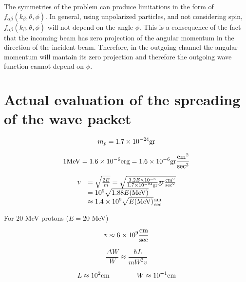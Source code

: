 The symmetries of the problem can produce limitations in the form of $f_{\alpha \beta}(k_{\beta},\theta,\phi)$. In general, using unpolarized particles, and not considering spin, $f_{\alpha \beta}(k_{\beta},\theta,\phi)$ will not depend on the angle $\phi$. This is a consequence of the fact that the incoming beam has zero projection of the angular momentum in the direction of the incident beam. Therefore, in the outgoing channel the angular momentum will mantain its zero projection and therefore the outgoing wave function cannot depend on $\phi$.



\section{Actual evaluation of the spreading of the wave packet}

\begin{equation}
m_p = 1.7 \times 10^{-24} {\rm gr}
\end{equation}

\begin{equation}
1 {\rm MeV} = 1.6 \times 10^{-6} {\rm erg} = 1.6 \times 10^{-6} {\rm gr} \frac{{\rm cm}^2}{{\rm sec}^2}
\end{equation}

\begin{equation}
\begin{array}{rl}
v &= \sqrt{\frac{2E}{m}} = \sqrt{\frac{3.2 E \times 10^{-6}}{1.7 \times 10^{-24} {\rm gr}}{\rm gr} \frac{{\rm cm}^2}{{\rm sec}^2}} \\
  &= 10^9 \sqrt{1.88 E ({\rm MeV})} \\
	&\approx 1.4 \times 10^9 \sqrt{E({\rm MeV})} \frac{{\rm cm}}{{\rm sec}}
\end{array}
\end{equation}

For $20$ MeV protons ($E = 20$ MeV)

\begin{equation}
v \approx 6 \times 10^{9} \frac{{\rm cm}}{{\rm sec}}
\end{equation}

\begin{equation}
\frac{\Delta W}{W} \approx \frac{\hbar L}{m W^2 v}
\end{equation}

\begin{equation}
L \approx 10^2 {\rm cm} \qquad \qquad W \approx 10^{-1} {\rm cm}
\end{equation}


